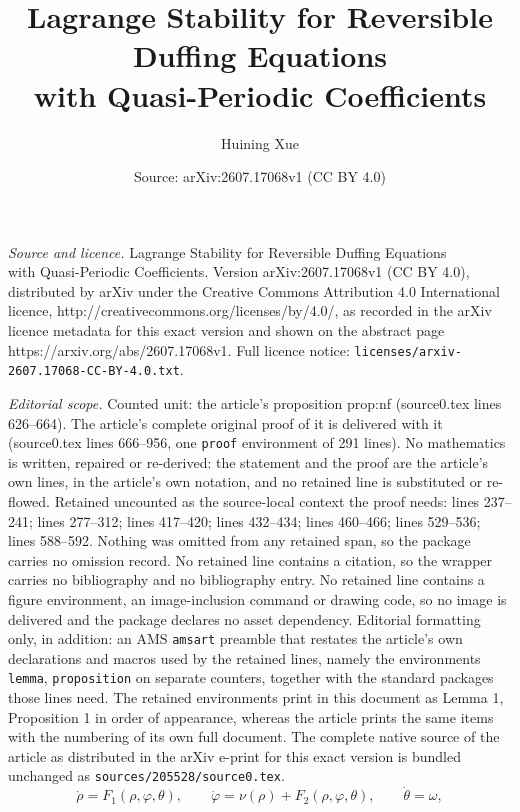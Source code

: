 \documentclass[10pt,a4paper]{amsart}
\title{Lagrange Stability for Reversible Duffing Equations\\ with Quasi-Periodic Coefficients}
\author{Huining Xue}
\date{Source: arXiv:2607.17068v1 (CC BY 4.0)}
\begin{document}
\maketitle

\noindent\emph{Source and licence.} Lagrange Stability for Reversible Duffing Equations\\ with Quasi-Periodic Coefficients. Version arXiv:2607.17068v1 (CC BY 4.0), distributed by arXiv under the Creative Commons Attribution 4.0 International licence, http://creativecommons.org/licenses/by/4.0/, as recorded in the arXiv licence metadata for this exact version and shown on the abstract page https://arxiv.org/abs/2607.17068v1. Full licence notice: \texttt{licenses/arxiv-2607.17068-CC-BY-4.0.txt}.\par\smallskip

\noindent\textit{Editorial scope.} Counted unit: the article's proposition prop:nf (source0.tex lines 626--664). The article's complete original proof of it is delivered with it (source0.tex lines 666--956, one \texttt{proof} environment of 291 lines). No mathematics is written, repaired or re-derived: the statement and the proof are the article's own lines, in the article's own notation, and no retained line is substituted or re-flowed.  Retained uncounted as the source-local context the proof needs: lines 237--241; lines 277--312; lines 417--420; lines 432--434; lines 460--466; lines 529--536; lines 588--592.  Nothing was omitted from any retained span, so the package carries no omission record.  No retained line contains a citation, so the wrapper carries no bibliography and no bibliography entry.  No retained line contains a figure environment, an image-inclusion command or drawing code, so no image is delivered and the package declares no asset dependency.  Editorial formatting only, in addition: an AMS \texttt{amsart} preamble that restates the article's own declarations and macros used by the retained lines, namely the environments \texttt{lemma}, \texttt{proposition} on separate counters, together with the standard packages those lines need.  The retained environments print in this document as Lemma 1, Proposition 1 in order of appearance, whereas the article prints the same items with the numbering of its own full document.  The complete native source of the article as distributed in the arXiv e-print for this exact version is bundled unchanged as \texttt{sources/205528/source0.tex}.
\begin{equation}\label{eq:AAfield}
 \dot\rho=F_1(\rho,\varphi,\theta),\qquad
 \dot\varphi=\nu(\rho)+F_2(\rho,\varphi,\theta),\qquad
 \dot\theta=\omega,
\end{equation}
\end{document}
